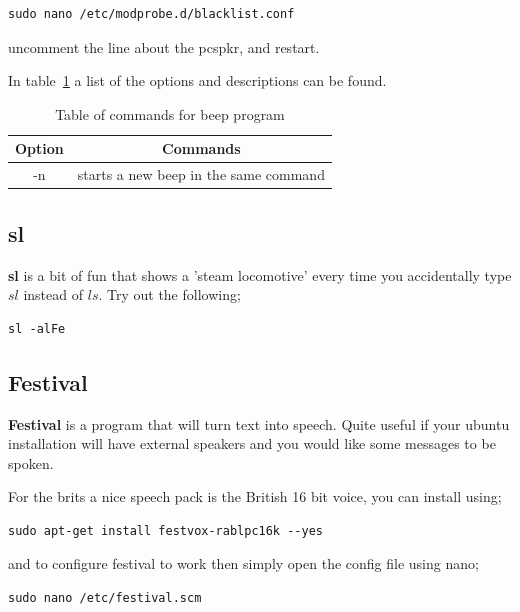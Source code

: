 \begin{lstlisting}
sudo nano /etc/modprobe.d/blacklist.conf
\end{lstlisting}

uncomment the line about the pcspkr, and restart.

In table~\ref{tab:beep} a list of the options and descriptions can be found.

\begin{table}[!th]
\centering
\begin{tabular}{cc}
\hline
Option & Commands\\
\hline
-n & starts a new beep in the same command\\
\hline
\end{tabular}
\caption{Table of commands for beep program}
\label{tab:beep}
\end{table}


\subsection{sl}

\textbf{sl} is a bit of fun that shows a 'steam locomotive' every time you accidentally type $sl$ instead of $ls$.  Try out the following;

\begin{lstlisting}
sl -alFe
\end{lstlisting}

\subsection{Festival}
\textbf{Festival} is a program that will turn text into speech.  Quite useful if your ubuntu installation will have external speakers and you would like some messages to be spoken.

For the brits a nice speech pack is the British 16 bit voice, you can install using;

\begin{lstlisting}
sudo apt-get install festvox-rablpc16k --yes
\end{lstlisting}

and to configure festival to work then simply open the config file using nano;

\begin{lstlisting}
sudo nano /etc/festival.scm
\end{lstlisting}

